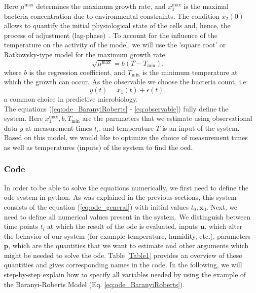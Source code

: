 \documentclass[graybox]{svmult}
\newcommand{\mbx}{\mathbf{x}}
\newcommand{\mbu}{\mathbf{u}}
\newcommand{\mbp}{\mathbf{p}}
\begin{document}
Here $\mu^\text{max}$ determines the maximum growth rate, and $x_1^\text{max}$ is the maximal bacteria concentration due to environmental constraints.
The condition $x_2(0)$ allows to quantify the initial physiological state of the cells and, hence, the process of adjustment (lag-phase)~\cite{grijspeerdt_estimating_1999}.
To account for the influence of the temperature on the activity of the model, we will use the 'square root' or Ratkowsky-type model for the maximum growth rate~\cite{ratkowsky_relationship_1982}
\begin{equation}
    \sqrt{\mu^\text{max}} = b (T - T_\text{min}),
    \label{eq:RatkowskyModel}
\end{equation}
where $b$ is the regression coefficient, and $T_\text{min}$ is the minimum temperature at which the growth can occur.
As the observable we choose the bacteria count, i.e:
\begin{equation}
    y(t) = x_1(t)+\epsilon(t),
    \label{eq:observable}
 \end{equation}
a common choice in predictive microbiology.\\
The equations (\ref{eq:ode_BaranyiRoberts} - \ref{eq:observable}) fully define the system.
Here $x_1^\text{max}, b, T_\text{min}$ are the parameters that we estimate using observational data $y$ at measurement times $t_i$, and temperature $T$ is an input of the system.
Based on this model, we would like to optimize the choice of measurement times as well as temperatures (inputs) of the system to find the \acl{oed}.
%
\subsubsection*{Code}
In order to be able to solve the equations numerically, we first need to define the \ac{ode} system in python.
As was explained in the previous sections, this system consists of the equation (\ref{eq:ode_general}) with initial values $t_0, \mbx_0$.
Next, we need to define all numerical values present in the system.
We distinguish between time points $t_i$ at which the result of the \ac{ode} is evaluated, inputs $\mbu$, which alter the behavior of our system (for example temperature, humidity, etc.), parameters $\mbp$, which are the quantities that we want to estimate and other arguments which might be needed to solve the \ac{ode}.
Table \ref{Table1} provides an overview of these quantities and gives corresponding names in the code.
In the following, we will step-by-step explain how to specify all variables needed by using the example of the Baranyi-Roberts Model (Eq. \ref{eq:ode_BaranyiRoberts}).
\end{document}
